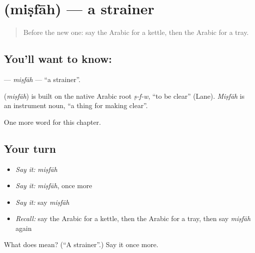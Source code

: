 \section[\texorpdfstring{\ar{مصفاة} (miṣfāh)}{مصفاة (miṣfāh)}]{ (miṣfāh) — a strainer}

\label{lesson:AR-C278-misfah}



\begin{quote}
Before the new one: say the Arabic for a kettle, then the Arabic for a tray.
\end{quote}

\subsection*{You'll want to know: }
\textbf{} — \emph{miṣfāh} — \textquotedblleft{}a strainer\textquotedblright{}.

\begin{cousinweb}
\textbf{} (\emph{miṣfāh}) is built on the native Arabic root \emph{ṣ-f-w}, \textquotedblleft{}to be clear\textquotedblright{} (Lane). \emph{Miṣfāh} is an instrument noun, \textquotedblleft{}a thing for making clear\textquotedblright{}.
\end{cousinweb}

\begin{grammarlens}[title={What you've built}]
One more word for this chapter.
\end{grammarlens}

\subsection*{Your turn}
\begin{itemize}
\raggedright
  \item \emph{Say it:} \emph{miṣfāh}
  \item \emph{Say it:} \emph{miṣfāh}, once more
  \item \emph{Say it:} say \emph{miṣfāh}
  \item \emph{Recall:} say the Arabic for a kettle, then the Arabic for a tray, then say \emph{miṣfāh} again
\end{itemize}

\begin{tcolorbox}[breakable,colback=teal!4,colframe=teal!35!black,title={Before you move on}]
What does  mean? (\textquotedblleft{}A strainer\textquotedblright{}.) Say it once more.
\end{tcolorbox}
